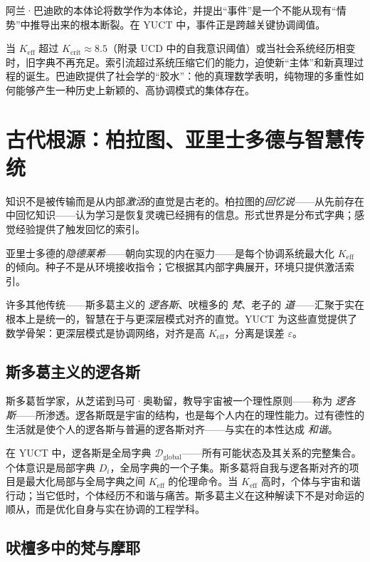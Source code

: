 \documentclass[12pt,a4paper]{article}
\newcommand{\Keff}{K_{\mathrm{eff}}}
\begin{document}
	阿兰·巴迪欧的本体论将数学作为本体论，并提出“事件”是一个不能从现有“情势”中推导出来的根本断裂。在 YUCT 中，事件正是跨越关键协调阈值。
	
	当 \(\Keff\) 超过 \(K_{\mathrm{crit}} \approx 8.5\)（附录 UCD 中的自我意识阈值）或当社会系统经历相变时，旧字典不再充足。索引流超过系统压缩它们的能力，迫使新“主体”和新真理过程的诞生。巴迪欧提供了社会学的“胶水”：他的真理数学表明，纯物理的多重性如何能够产生一种历史上新颖的、高协调模式的集体存在。
	
	
	
	\section{古代根源：柏拉图、亚里士多德与智慧传统}
	
	知识不是被传输而是从内部\emph{激活}的直觉是古老的。柏拉图的\emph{回忆说}——从先前存在中回忆知识——认为学习是恢复灵魂已经拥有的信息。形式世界是分布式字典；感觉经验提供了触发回忆的索引。
	
	亚里士多德的\emph{隐德莱希}——朝向实现的内在驱力——是每个协调系统最大化 \(K_{\mathrm{eff}}\) 的倾向。种子不是从环境接收指令；它根据其内部字典展开，环境只提供激活索引。
	
	许多其他传统——斯多葛主义的 \emph{逻各斯}、吠檀多的 \emph{梵}、老子的 \emph{道}——汇聚于实在根本上是统一的，智慧在于与更深层模式对齐的直觉。YUCT 为这些直觉提供了数学骨架：更深层模式是协调网络，对齐是高 \(K_{\mathrm{eff}}\)，分离是误差 \(\varepsilon\)。
	
	\subsection{斯多葛主义的逻各斯}
	
	斯多葛哲学家，从芝诺到马可·奥勒留，教导宇宙被一个理性原则——称为 \emph{逻各斯}——所渗透。逻各斯既是宇宙的结构，也是每个人内在的理性能力。过有德性的生活就是使个人的逻各斯与普遍的逻各斯对齐——与实在的本性达成 \emph{和谐}。
	
	在 YUCT 中，逻各斯是全局字典 \(\mathcal{D}_{\text{global}}\)——所有可能状态及其关系的完整集合。个体意识是局部字典 \(D_i\)，全局字典的一个子集。斯多葛将自我与逻各斯对齐的项目是最大化局部与全局字典之间 \(K_{\mathrm{eff}}\) 的伦理命令。当 \(K_{\mathrm{eff}}\) 高时，个体与宇宙和谐行动；当它低时，个体经历不和谐与痛苦。斯多葛主义在这种解读下不是对命运的顺从，而是优化自身与实在协调的工程学科。
	
	\subsection{吠檀多中的梵与摩耶}
	
\end{document}
